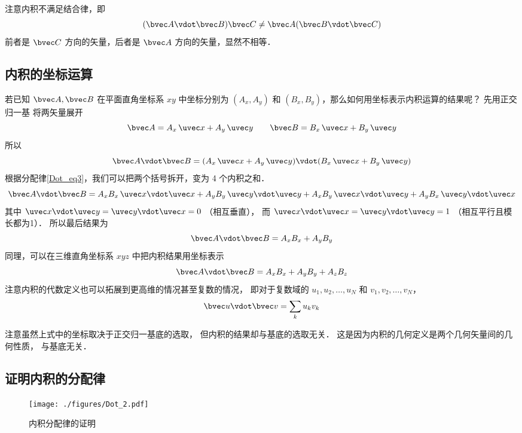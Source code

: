 注意内积不满足结合律，即
\begin{equation}
(\bvec A \vdot \bvec B) \bvec C \ne  \bvec A (\bvec B \vdot \bvec C)
\end{equation}
前者是 $\bvec C$ 方向的矢量，后者是 $\bvec A$ 方向的矢量，显然不相等．

\subsection{内积的坐标运算}
若已知 $\bvec A, \bvec B$ 在平面直角坐标系 $xy$ 中坐标分别为 $(A_x, A_y)$ 和  $(B_x, B_y)$，那么如何用坐标表示内积运算的结果呢？ 先用正交归一基 将两矢量展开 %
\begin{equation}
\bvec A = A_x \,\uvec x + A_y \,\uvec y \qquad \bvec B = B_x \,\uvec x + B_y \,\uvec y
\end{equation}
所以
\begin{equation}
\bvec A \vdot \bvec B = (A_x \,\uvec x + A_y \,\uvec y) \vdot (B_x \,\uvec x + B_y \,\uvec y)
\end{equation}
根据分配律\autoref{Dot_eq3}，我们可以把两个括号拆开，变为 4 个内积之和． 
\begin{equation}
\bvec A \vdot \bvec B = A_x B_x \,\uvec x \vdot \uvec x + A_y B_y \,\uvec y \vdot \uvec y + A_x B_y \,\uvec x \vdot \uvec y + A_y B_x \,\uvec y \vdot \uvec x
\end{equation}
其中 $\uvec x \vdot \uvec y = \uvec y \vdot \uvec x = 0$ （相互垂直）， 而 $\uvec x \vdot \uvec x = \uvec y \vdot \uvec y = 1$ （相互平行且模长都为1）． 所以最后结果为
\begin{equation}
\bvec A \vdot \bvec B = A_x B_x + A_y B_y
\end{equation}
同理，可以在三维直角坐标系 $xyz$ 中把内积结果用坐标表示
\begin{equation}\label{Dot_eq4}
\bvec A \vdot \bvec B = A_x B_x + A_y B_y + A_z B_z	
\end{equation}
注意内积的代数定义也可以拓展到更高维的情况甚至复数的情况， 即对于复数域的 $u_1, u_2, \dots, u_N$ 和 $v_1, v_2, \dots, v_N$，
\begin{equation}
\bvec u \vdot \bvec v = \sum_k u_k v_k
\end{equation}

注意虽然上式中的坐标取决于正交归一基底的选取， 但内积的结果却与基底的选取无关． 这是因为内积的几何定义是两个几何矢量间的几何性质， 与基底无关．

\subsection{证明内积的分配律}
\begin{figure}[ht]
\centering
\texttt{[image: ./figures/Dot\_2.pdf]}
\caption{内积分配律的证明} \label{Dot_fig2}
\end{figure}

